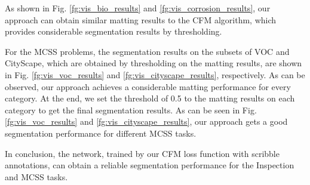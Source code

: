 \documentclass[journal]{IEEEtran}
\begin{document}
As shown in Fig. \ref{fg:vis_bio_results} and \ref{fg:vis_corrosion_results}, our approach can obtain similar matting results to the CFM algorithm, which provides considerable segmentation results by thresholding. 

For the MCSS problems, the segmentation results on the subsets of VOC and CityScape, which are obtained by thresholding on the matting results, are shown in Fig. \ref{fg:vis_voc_results} and \ref{fg:vis_cityscape_results}, respectively. As can be observed, our approach achieves a considerable matting performance for every category. At the end, we set the threshold of 0.5 to the matting results on each category to get the final segmentation results. As can be seen in Fig. \ref{fg:vis_voc_results} and \ref{fg:vis_cityscape_results}, our approach gets a good segmentation performance for different MCSS tasks.

In conclusion, the network, trained by our CFM loss function with scribble annotations, can obtain a reliable segmentation performance for the Inspection and MCSS tasks.
\end{document}
